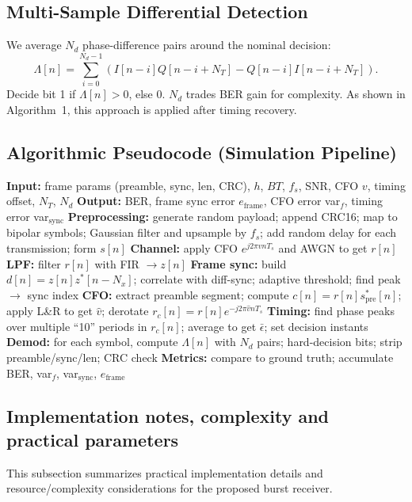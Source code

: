 \documentclass[conference]{IEEEtran}
\begin{document}
\subsection{Multi-Sample Differential Detection}
We average $N_d$ phase-difference pairs around the nominal decision:
\begin{equation}
\Lambda[n]=\sum_{i=0}^{N_d-1}\left(I[n-i]Q[n-i+N_T]-Q[n-i]I[n-i+N_T]\right).
\end{equation}
Decide bit 1 if $\Lambda[n]>0$, else 0. $N_d$ trades BER gain for complexity. As shown in Algorithm~1, this approach is applied after timing recovery.

\subsection{Algorithmic Pseudocode (Simulation Pipeline)}
\begin{algorithm}[t]
\caption{Burst GFSK Receiver Simulation Pipeline}
\begin{algorithmic}[1]
\State \textbf{Input:} frame params (preamble, sync, len, CRC), $h$, $BT$, $f_s$, SNR, CFO $v$, timing offset, $N_T$, $N_d$
\State \textbf{Output:} BER, frame sync error $e_{\text{frame}}$, CFO error var$_f$, timing error var$_{\text{sync}}$
\State \textbf{Preprocessing:} generate random payload; append CRC16; map to bipolar symbols; Gaussian filter and upsample by $f_s$; add random delay for each transmission; form $s[n]$
\State \textbf{Channel:} apply CFO $e^{j2\pi v nT_s}$ and AWGN to get $r[n]$
\State \textbf{LPF:} filter $r[n]$ with FIR $\rightarrow z[n]$
\State \textbf{Frame sync:} build $d[n]=z[n]z^{*}[n-N_x]$; correlate with diff-sync; adaptive threshold; find peak $\rightarrow$ sync index
\State \textbf{CFO:} extract preamble segment; compute $c[n]=r[n]s_{\text{pre}}^{*}[n]$; apply L\&R to get $\hat{v}$; derotate $r_c[n]=r[n]e^{-j2\pi \hat{v} nT_s}$
\State \textbf{Timing:} find phase peaks over multiple ``10'' periods in $r_c[n]$; average to get $\bar{\epsilon}$; set decision instants
\State \textbf{Demod:} for each symbol, compute $\Lambda[n]$ with $N_d$ pairs; hard-decision bits; strip preamble/sync/len; CRC check
\State \textbf{Metrics:} compare to ground truth; accumulate BER, var$_f$, var$_{\text{sync}}$, $e_{\text{frame}}$
\end{algorithmic}
\end{algorithm}
\subsection{Implementation notes, complexity and practical parameters}
This subsection summarizes practical implementation details and resource/complexity considerations for the proposed burst receiver.
\end{document}
